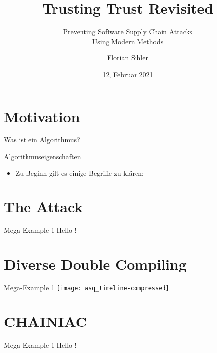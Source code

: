 \documentclass[aspectratio=169,usepdftitle=true]{beamer}
\title{Trusting Trust Revisited}
\subtitle{Preventing Software Supply Chain Attacks\hfill\\Using Modern Methods}
\institute{Institute of Distributed Systems, Ulm University}
\date{12, Februar 2021}
\author{Florian Sihler}
\begin{document}
\section{Motivation}

\begin{frame}{Was ist ein Algorithmus?}
    \lipsum[2]
\end{frame}

\begin{frame}{Algorithmuseigenschaften}
    \begin{itemize}
        \item Zu Beginn gilt es einige Begriffe zu klären: 
    \end{itemize}
\end{frame}

\section{The Attack}

\begin{frame}{Mega-Example 1}
    Hello \cite{Thompson1984}!
\end{frame}

\section{Diverse Double Compiling}

\begin{frame}{Mega-Example 1}
    \hspace*{-.2\linewidth}\texttt{[image: asq\_timeline-compressed]}
\end{frame}

\section{CHAINIAC}

\begin{frame}{Mega-Example 1}
    Hello \cite{Nikitin2017}!
\end{frame}
\end{document}
